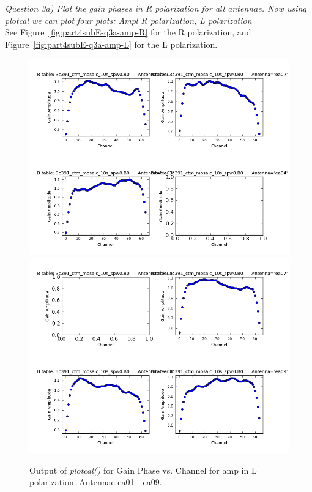 \documentclass[12pt, a4paper]{article}
\begin{document}
\noindent \textit{Question 3a) Plot the gain phases in R polarization for all antennae. Now using plotcal we can plot four plots: Ampl R polarization, L polarization} \\
See Figure~\ref{fig:part4subE-q3a-amp-R} for the R polarization, and Figure~\ref{fig:part4subE-q3a-amp-L} for the L polarization. \\

\newpage
\begin{figure}[h!]
\centering
\includegraphics[scale=0.65]{../Imaging/plots2/part4-subE-question3a_amp_pol-L-ea01-ea04.png}
\includegraphics[scale=0.65]{../Imaging/plots2/part4-subE-question3a_amp_pol-L-ea05-ea09.png}
\caption{Output of \emph{plotcal()} for Gain Phase vs. Channel for amp in L polarization. Antennae ea01 - ea09.}
\end{figure}
\addtocounter{figure}{-1}
\end{document}
